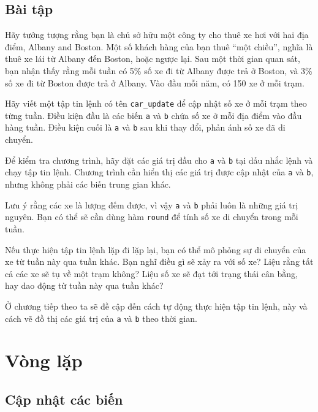 \documentclass[12pt]{book}
\begin{document}
\section{Bài tập}

\begin{ex}
\label{cargame}

Hãy tưởng tượng rằng bạn là chủ sở hữu một công ty cho thuê xe hơi
với hai địa điểm, Albany and Boston. Một số khách hàng của bạn thuê
``một chiều'', nghĩa là thuê xe lái từ Albany đến Boston, hoặc 
ngược lại. Sau một thời gian quan sát, bạn nhận thấy rằng mỗi tuần
có 5\% số xe đi từ Albany được trả ở Boston, và 3\% số xe đi từ
Boston được trả ở Albany. Vào đầu mỗi năm, có 150 xe ở mỗi trạm.

Hãy viết một tập tin lệnh có tên {\tt car\_update} để cập nhật số xe
ở mỗi trạm theo từng tuần. Điều kiện đầu là các biến {\tt a} 
và {\tt b} chứa số xe ở mỗi địa điểm vào đầu hàng tuần. Điều kiện 
cuối là {\tt a} và {\tt b} sau khi thay đổi, phản ánh số xe đã 
di chuyển.

Để kiểm tra chương trình, hãy đặt các giá trị đầu cho {\tt a} 
và {\tt b} tại dấu nhắc lệnh và chạy tập tin lệnh. Chương trình cần
hiển thị các giá trị được cập nhật của {\tt a} và {\tt b}, 
nhưng không phải các biến trung gian khác.

Lưu ý rằng các xe là lượng đếm được, vì vậy {\tt a} và 
{\tt b} phải luôn là những giá trị nguyên. Bạn có thể sẽ cần dùng 
hàm {\tt round} để tính số xe di chuyển trong mỗi tuần.

Nếu thực hiện tập tin lệnh lặp đi lặp lại, bạn có thể mô phỏng sự
di chuyển của xe từ tuần này qua tuần khác. Bạn nghĩ điều gì sẽ
xảy ra với số xe? Liệu rằng tất cả các xe sẽ tụ về một trạm không?
Liệu số xe sẽ đạt tới trạng thái cân bằng, hay dao động từ tuần này
qua tuần khác?

Ở chương tiếp theo ta sẽ đề cập đến cách tự động thực hiện tập tin lệnh, 
này và cách vẽ đồ thị các giá trị của {\tt a} và {\tt b} 
theo thời gian.
\end{ex}



\chapter{Vòng lặp}

\section{Cập nhật các biến}
\end{document}
